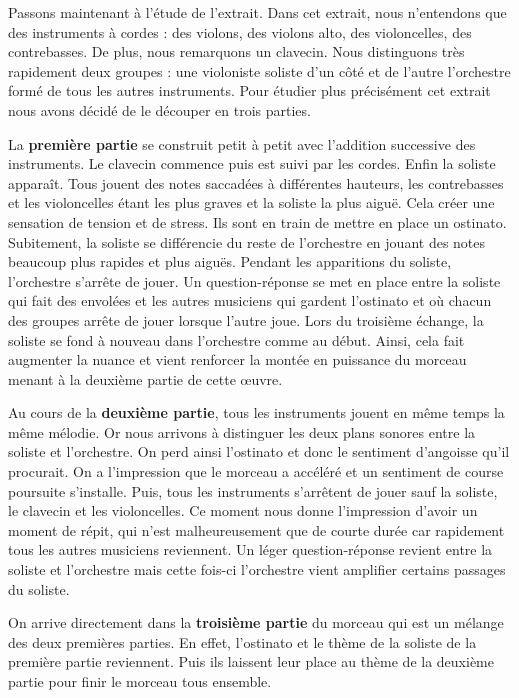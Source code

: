 \documentclass[12pt]{article}
\begin{document}
\vspace{0.3cm}

Passons maintenant à l’étude de l’extrait.
Dans cet extrait, nous n’entendons que des instruments à cordes : des violons, des violons alto, des violoncelles, des contrebasses. De plus, nous remarquons un clavecin. Nous distinguons très rapidement deux groupes : une violoniste soliste d’un côté et de l’autre l’orchestre formé de tous les autres instruments. Pour étudier plus précisément cet extrait nous avons décidé de le découper en trois parties.

La \textbf{première partie} se construit petit à petit avec l’addition successive des instruments. Le clavecin commence puis est suivi par les cordes. Enfin la soliste apparaît. Tous jouent des notes saccadées à différentes hauteurs, les contrebasses et les violoncelles étant les plus graves et la soliste la plus aiguë. Cela créer une sensation de tension et de stress. Ils sont en train de mettre en place un ostinato. 
Subitement, la soliste se différencie du reste de l'orchestre en jouant des notes beaucoup plus rapides et plus aiguës. Pendant les apparitions du soliste, l’orchestre s’arrête de jouer. Un question-réponse se met en place entre la soliste qui fait des envolées et les autres musiciens qui gardent l’ostinato et où chacun des groupes arrête de jouer lorsque l’autre joue. Lors du troisième échange, la soliste se fond à nouveau dans l’orchestre comme au début. Ainsi, cela fait augmenter la nuance et vient renforcer la montée en puissance du morceau menant à la deuxième partie de cette œuvre.

Au cours de la \textbf{deuxième partie}, tous les instruments jouent en même temps la même mélodie. Or nous arrivons à distinguer les deux plans sonores entre la soliste et l’orchestre. On perd ainsi l’ostinato et donc le sentiment d’angoisse qu’il procurait. On a l’impression que le morceau a accéléré et un sentiment de course poursuite s’installe. Puis, tous les instruments s’arrêtent de jouer sauf la soliste, le clavecin et les violoncelles. Ce moment nous donne l’impression d’avoir un moment de répit, qui n’est malheureusement que de courte durée car rapidement tous les autres musiciens reviennent. Un léger question-réponse revient entre la soliste et l’orchestre mais cette fois-ci l’orchestre vient amplifier certains passages du soliste.

On arrive directement dans la \textbf{troisième partie} du morceau qui est un mélange des deux premières parties. En effet, l’ostinato et le thème de la soliste de la première partie reviennent. Puis ils laissent leur place au thème de la deuxième partie pour finir le morceau tous ensemble.
\end{document}
